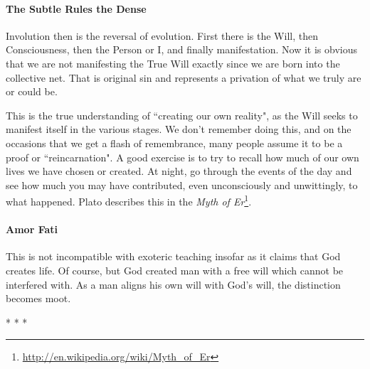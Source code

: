 \paragraph{The Subtle Rules the Dense}
Involution then is the reversal of evolution. First there is the Will, then Consciousness, then the Person or I, and finally manifestation. Now it is obvious that we are not manifesting the True Will exactly since we are born into the collective net. That is original sin and represents a privation of what we truly are or could be.

This is the true understanding of ``creating our own reality", as the Will seeks to manifest itself in the various stages. We don't remember doing this, and on the occasions that we get a flash of remembrance, many people assume it to be a proof or ``reincarnation". A good exercise is to try to recall how much of our own lives we have chosen or created. At night, go through the events of the day and see how much you may have contributed, even unconsciously and unwittingly, to what happened. Plato describes this in the \textit{Myth of Er}\footnote{\url{http://en.wikipedia.org/wiki/Myth_of_Er}}.

\paragraph{Amor Fati}
This is not incompatible with exoteric teaching insofar as it claims that God creates life. Of course, but God created man with a free will which cannot be interfered with. As a man aligns his own will with God's will, the distinction becomes moot.




\begin{center}* * *\end{center}

